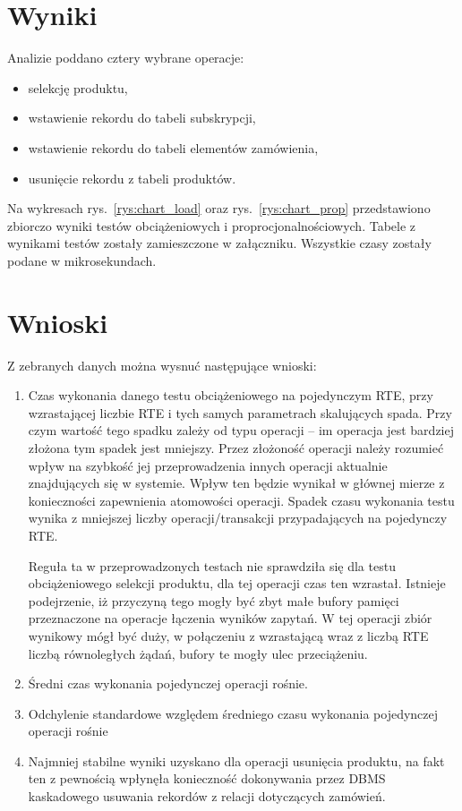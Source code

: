 \section{Wyniki}
Analizie poddano cztery wybrane operacje:
\begin{itemize}
\item selekcję produktu,
\item wstawienie rekordu do tabeli subskrypcji,
\item wstawienie rekordu do tabeli elementów zamówienia, 
\item usunięcie rekordu z tabeli produktów.
\end{itemize}

Na wykresach rys.~\ref{rys:chart_load} oraz rys.~\ref{rys:chart_prop} przedstawiono zbiorczo
wyniki testów obciążeniowych i proprocjonalnościowych. Tabele z wynikami testów zostały zamieszczone w załączniku.
Wszystkie czasy zostały podane w mikrosekundach.

\section{Wnioski}
Z zebranych danych można wysnuć następujące wnioski:
\begin{enumerate}
\item Czas wykonania danego testu obciążeniowego na pojedynczym RTE, przy wzrastającej liczbie RTE 
i tych samych parametrach skalujących spada. Przy czym wartość tego spadku zależy od typu operacji -- im
operacja jest bardziej złożona tym spadek jest mniejszy. Przez złożoność operacji należy rozumieć wpływ
na szybkość jej przeprowadzenia innych operacji aktualnie znajdujących się w systemie. Wpływ ten będzie wynikał
w głównej mierze z konieczności zapewnienia atomowości operacji. Spadek czasu wykonania testu wynika z mniejszej 
liczby operacji/transakcji przypadających na pojedynczy RTE. 

Reguła ta w przeprowadzonych testach nie sprawdziła się dla testu obciążeniowego selekcji produktu, dla tej operacji
czas ten wzrastał. Istnieje podejrzenie, iż przyczyną tego mogły być zbyt małe bufory pamięci przeznaczone na operacje
łączenia wyników zapytań. W tej operacji zbiór wynikowy mógł być duży, w połączeniu z wzrastającą wraz z liczbą RTE 
liczbą równoległych żądań, bufory te mogły ulec przeciążeniu.
\item Średni czas wykonania pojedynczej operacji rośnie.
\item Odchylenie standardowe względem średniego czasu wykonania pojedynczej operacji rośnie
\item Najmniej stabilne wyniki uzyskano dla operacji usunięcia produktu, na fakt ten z pewnością wpłynęła konieczność dokonywania
przez DBMS kaskadowego usuwania rekordów z relacji dotyczących zamówień.
\end{enumerate}

